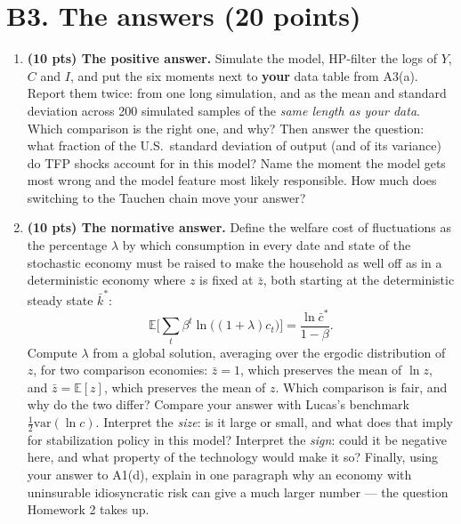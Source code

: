 \documentclass[11pt]{article}
\newif\ifsolutions \solutionsfalse
\newcommand{\solution}[1]{\ifsolutions\medskip
  {\color{blue!45!black}\textbf{Solution.} #1}\medskip\fi}
\begin{document}
\section*{B3. The answers (20 points)}

\begin{enumerate}[label=(\alph*), leftmargin=*]

\item \textbf{(10 pts) The positive answer.} Simulate the model, HP-filter the logs of $Y$, $C$ and
$I$, and put the six moments next to \textbf{your} data table from A3(a). Report them twice: from
one long simulation, and as the mean and standard deviation across 200 simulated samples of the
\emph{same length as your data}. Which comparison is the right one, and why? Then answer the
question: what fraction of the U.S.\ standard deviation of output (and of its variance) do TFP
shocks account for in this model? Name the moment the model gets most wrong and the model feature
most likely responsible. How much does switching to the Tauchen chain move your answer?

\solution{\keyBseven}

\item \textbf{(10 pts) The normative answer.} Define the welfare cost of fluctuations as the
percentage $\lambda$ by which consumption in every date and state of the stochastic economy must be
raised to make the household as well off as in a deterministic economy where $z$ is fixed at
$\bar z$, both starting at the deterministic steady state $\bar k^*$:
\[
  \mathbb{E}\Big[\sum_t\beta^t\ln\big((1+\lambda)c_t\big)\Big]=\frac{\ln \bar c^*}{1-\beta}.
\]
Compute $\lambda$ from a global solution, averaging over the ergodic distribution of $z$, for two
comparison economies: $\bar z=1$, which preserves the mean of $\ln z$, and
$\bar z=\mathbb{E}[z]$, which preserves the mean of $z$. Which comparison is fair, and why do the
two differ? Compare your answer with Lucas's benchmark $\tfrac12\mathrm{var}(\ln c)$. Interpret the \emph{size}: is it large or
small, and what does that imply for stabilization policy in this model? Interpret the \emph{sign}:
could it be negative here, and what property of the technology would make it so? Finally, using
your answer to A1(d), explain in one paragraph why an economy with uninsurable idiosyncratic risk can
give a much larger number --- the question Homework 2 takes up.

\solution{\keyBeight}

\end{enumerate}
\end{document}
